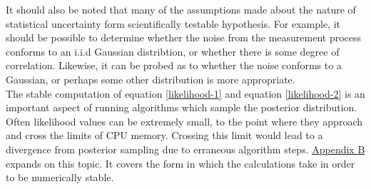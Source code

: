It should also be noted that many of the assumptions made about the nature of statistical uncertainty form scientifically testable hypothesis. For example, it should be possible to determine whether the noise from the measurement process conforms to an i.i.d Gaussian distribtion, or whether there is some degree of correlation. Likewise, it can be probed as to whether the noise conforms to a Gaussian, or perhaps some other distribution is more appropriate.\\

The stable computation of equation \ref{likelihood-1} and equation \ref{likelihood-2} is an important aspect of running algorithms which sample the posterior distribution. Often likelihood values can be extremely small, to the point where they approach and cross the limits of CPU memory. Crossing this limit would lead to a divergence from posterior sampling due to erraneous algorithm steps. \hyperref[AppendixB]{Appendix B} expands on this topic. It covers the form in which the calculations take in order to be numerically stable.\\

